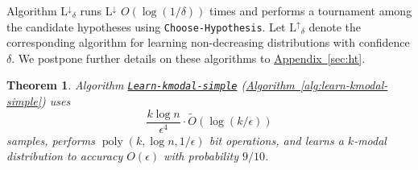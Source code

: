 \documentclass[10pt]{article}
\newtheorem{theorem}{Theorem}[section]
\theoremstyle{definition}
\numberwithin{equation}{section}
\newcommand{\expref}[2]{\texorpdfstring{\hyperref[#2]{#1~\ref{#2}}}{#1~\ref{#2}}}
\newcommand{\algorithml}[1]{{\normalfont\texttt{#1}}}
\newcommand{\eps}{\epsilon}
\newcommand{\poly}{\operatorname{poly}}
\newcommand{\AND}{{\mathrm{L^{\uparrow}}}}
\newcommand{\ANI}{{\mathrm{L^{\downarrow}}}}
\begin{document}
%

%
Algorithm
$\ANI_{\delta}$ runs $\ANI$ $O(\log(1/\delta))$ times
and performs a tournament among the candidate hypotheses using
\algorithml{Choose-Hypothesis}.
Let $\AND_{\delta}$ denote the corresponding  algorithm for learning
non-decreasing distributions with confidence $\delta$.
We postpone further details on these algorithms to
\expref{Appendix}{sec:ht}. 


\begin{theorem} \label{thm:correctness-learn-simple}
%
Algorithm
{\hyperref[alg:learn-kmodal-simple]{\algorithml{Learn-kmodal-simple}}}
%
 (\expref{Algorithm}{alg:learn-kmodal-simple})
%
uses
\[
\frac{k \log n}{\eps^4} \cdot \tilde{O}\left( \log (k/\eps)
  \right)
\]
samples,
performs
$\poly(k, \log n, 1/\eps)$ bit operations,
and learns a $k$-modal distribution to accuracy $O(\eps)$ with probability $9/10$.
\end{theorem}
\end{document}

